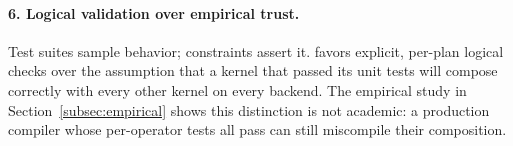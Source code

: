 \paragraph{6. Logical validation over empirical trust.}
Test suites sample behavior; constraints assert it. \gate{} favors
explicit, per-plan logical checks over the assumption that a kernel
that passed its unit tests will compose correctly with every other
kernel on every backend. The empirical study in
Section~\ref{subsec:empirical} shows this distinction is not
academic: a production compiler whose per-operator tests all pass can
still miscompile their composition.
